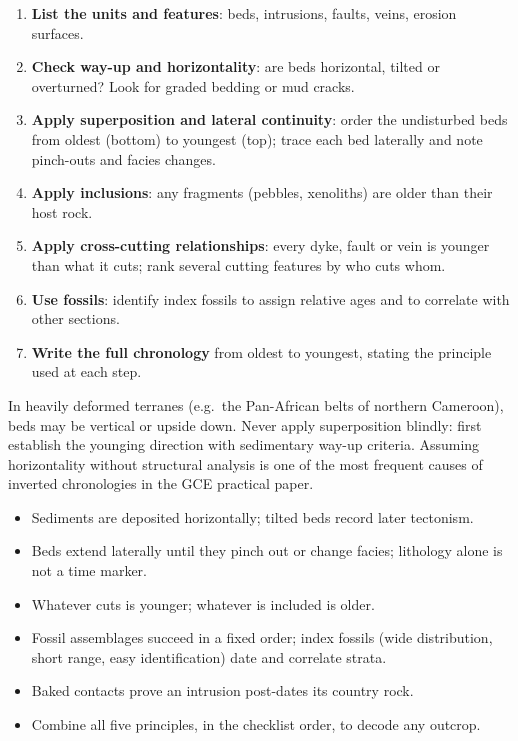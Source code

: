 \documentclass[11pt]{article}
\begin{document}
\begin{methode}
\begin{enumerate}
\item \textbf{List the units and features}: beds, intrusions, faults, veins, erosion surfaces.
\item \textbf{Check way-up and horizontality}: are beds horizontal, tilted or overturned? Look for graded bedding or mud cracks.
\item \textbf{Apply superposition and lateral continuity}: order the undisturbed beds from oldest (bottom) to youngest (top); trace each bed laterally and note pinch-outs and facies changes.
\item \textbf{Apply inclusions}: any fragments (pebbles, xenoliths) are older than their host rock.
\item \textbf{Apply cross-cutting relationships}: every dyke, fault or vein is younger than what it cuts; rank several cutting features by who cuts whom.
\item \textbf{Use fossils}: identify index fossils to assign relative ages and to correlate with other sections.
\item \textbf{Write the full chronology} from oldest to youngest, stating the principle used at each step.
\end{enumerate}
\end{methode}

\begin{attention}
In heavily deformed terranes (e.g.\ the Pan-African belts of northern Cameroon), beds may be vertical or upside down. Never apply superposition blindly: first establish the younging direction with sedimentary way-up criteria. Assuming horizontality without structural analysis is one of the most frequent causes of inverted chronologies in the GCE practical paper.
\end{attention}

\begin{aretenir}
\begin{itemize}
\item Sediments are deposited horizontally; tilted beds record later tectonism.
\item Beds extend laterally until they pinch out or change facies; lithology alone is not a time marker.
\item Whatever cuts is younger; whatever is included is older.
\item Fossil assemblages succeed in a fixed order; index fossils (wide distribution, short range, easy identification) date and correlate strata.
\item Baked contacts prove an intrusion post-dates its country rock.
\item Combine all five principles, in the checklist order, to decode any outcrop.
\end{itemize}
\end{aretenir}
\end{document}
